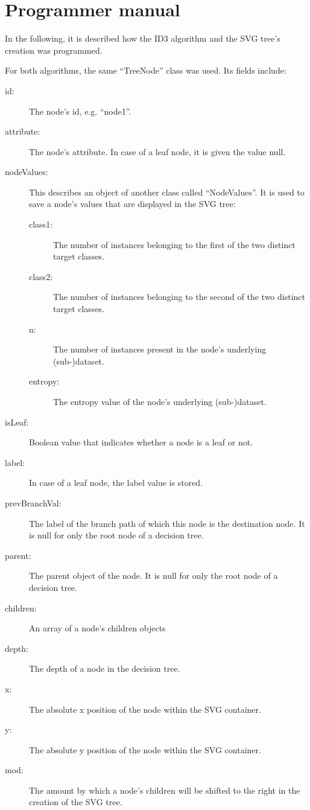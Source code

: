 \section{Programmer manual}
In the following, it is described how the ID3 algorithm and the SVG tree's creation was programmed.

For both algorithms, the same ``TreeNode'' class was used. Its fields include:
\begin{description}
    \item[id:] The node's id, e.g. ``node1''.
    \item[attribute:] The node's attribute. In case of a leaf node, it is given the value null.
    \item[nodeValues:] This describes an object of another class called ``NodeValues''. It is used to save a node's values that are displayed in the SVG tree:
    \begin{description}
        \item[class1:] The number of instances belonging to the first of the two distinct target classes.
        \item[class2:] The number of instances belonging to the second of the two distinct target classes.
        \item[n:] The number of instances present in the node's underlying (sub-)dataset.
        \item[entropy:] The entropy value of the node's underlying (sub-)dataset.
    \end{description}
    \item[isLeaf:] Boolean value that indicates whether a node is a leaf or not.
    \item[label:] In case of a leaf node, the label value is stored.
    \item[prevBranchVal:] The label of the branch path of which this node is the destination node. It is null for only the root node of a decision tree.
    \item[parent:] The parent object of the node. It is null for only the root node of a decision tree.
    \item[children:] An array of a node's children objects
    \item[depth:] The depth of a node in the decision tree.
    \item[x:] The absolute x position of the node within the SVG container.
    \item[y:] The absolute y position of the node within the SVG container.
    \item[mod:] The amount by which a node's children will be shifted to the right in the creation of the SVG tree.
\end{description}

